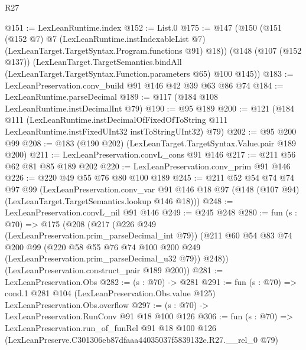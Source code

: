 \begin{lexlean}{R27}
\begin{coremodule}
@151 := LexLeanRuntime.index
@152 := List.{0}
@175 := @147
    (@150
      (@151
        (@152 @7)
        @7
        (LexLeanRuntime.instIndexableList @7)
        (LexLeanTarget.TargetSyntax.Program.functions @91)
        @18))
    (@148
      (@107 (@152 @137))
      (LexLeanTarget.TargetSemantics.bindAll
        (LexLeanTarget.TargetSyntax.Function.parameters @65)
        @100
        @145))
@183 := LexLeanPreservation.conv_build @91 @146 @42 @39 @63 @86 @74
@184 := LexLeanRuntime.parseDecimal
@189 := @117 (@184 @108 LexLeanRuntime.instDecimalInt @79)
@190 := @95 @189
@200 := @121
    (@184
      @111
      (LexLeanRuntime.instDecimalOfFixedOfToString
        @111
        LexLeanRuntime.instFixedUInt32
        instToStringUInt32)
      @79)
@202 := @95 @200 @99
@208 := @183 (@190 @202) (LexLeanTarget.TargetSyntax.Value.pair @189 @200)
@211 := LexLeanPreservation.convL_cons @91 @146
@217 := @211 @56 @62 @81 @85 @189 @202
@220 := LexLeanPreservation.conv_prim @91 @146
@226 := @220 @49 @55 @76 @80 @100 @189
@245 := @211
    @52
    @54
    @74
    @74
    @97
    @99
    (LexLeanPreservation.conv_var
      @91
      @146
      @18
      @97
      (@148 (@107 @94) (LexLeanTarget.TargetSemantics.lookup @146 @18)))
@248 := LexLeanPreservation.convL_nil @91 @146
@249 := @245 @248
@280 := fun (s : @70) =>
  @175
    (@208
      (@217
        (@226 @249 (LexLeanPreservation.prim_parseDecimal_int @79))
        (@211
          @60
          @54
          @83
          @74
          @200
          @99
          (@220 @58 @55 @76 @74 @100 @200 @249 (LexLeanPreservation.prim_parseDecimal_u32 @79))
          @248))
      (LexLeanPreservation.construct_pair @189 @200))
@281 := LexLeanPreservation.Obs
@282 := (s : @70) -> @281
@291 := fun (s : @70) =>
  cond.{1} @281 @104 (LexLeanPreservation.Obs.value @125) LexLeanPreservation.Obs.overflow
@297 := (s : @70) -> LexLeanPreservation.RunConv @91 @18 @100 @126
@306 := fun (s : @70) =>
  LexLeanPreservation.run_of_funRel
    @91
    @18
    @100
    @126
    (LexLeanPreserve.C301306eb87dfaaa44035037f5839132e.R27.__rel_0 @79)
\end{coremodule}
\end{lexlean}
